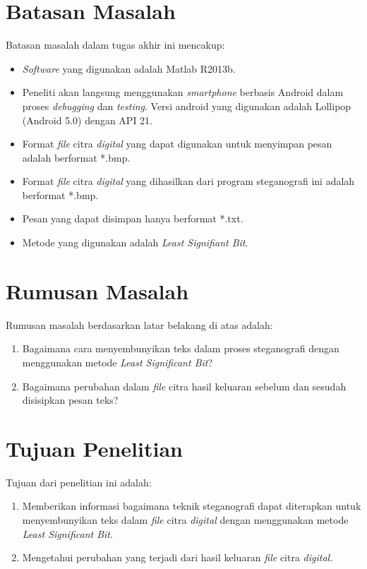 \section{Batasan Masalah}
Batasan masalah dalam tugas akhir ini mencakup:
\begin{itemize}
	\item \emph{Software} yang digunakan adalah Matlab R2013b.
	\item  Peneliti akan langsung menggunakan \emph{smartphone} berbasis Android dalam proses \emph{debugging} dan \emph{testing}. Versi android yang digunakan adalah Lollipop (Android 5.0) dengan API 21.
	\item Format \emph{file}  citra \emph{digital} yang dapat digunakan untuk menyimpan pesan adalah berformat *.bmp.
	\item Format \emph{file}  citra \emph{digital} yang dihasilkan dari program steganografi ini adalah berformat *.bmp.
	\item Pesan yang dapat disimpan hanya berformat *.txt.
	\item Metode yang digunakan adalah \emph{Least Signifiant Bit}.
\end{itemize}

\section{Rumusan Masalah}
Rumusan masalah berdasarkan latar belakang di atas adalah:
\begin{enumerate}
	\item Bagaimana cara menyembunyikan teks dalam proses steganografi dengan menggunakan metode \emph{Least Significant Bit}?
	\item Bagaimana perubahan dalam \emph{file} citra hasil keluaran sebelum dan sesudah disisipkan pesan teks?
\end{enumerate}


\section{Tujuan Penelitian}
Tujuan dari penelitian ini adalah: 
\begin{enumerate}
	\item Memberikan informasi bagaimana teknik steganografi dapat diterapkan untuk menyembunyikan teks dalam \emph{file} citra \emph{digital} dengan menggunakan metode \emph{Least Significant Bit}. 
	\item Mengetahui perubahan yang terjadi dari hasil keluaran \emph{file} citra \emph{digital}.
\end{enumerate}

